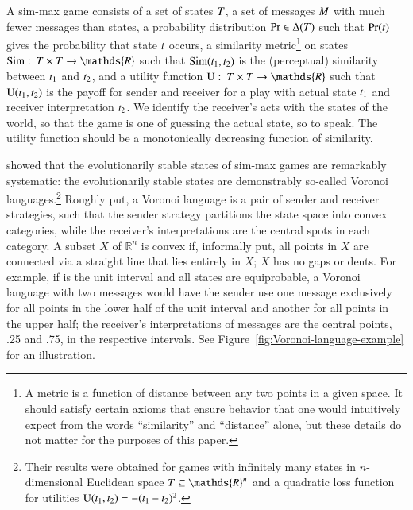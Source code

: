 \documentclass[fleqn,reqno,10pt]{article}
\newcommand{\similarity}{\ensuremath{\mathrm{Sim}}} %
\begin{document}
A sim-max game consists of a set of states $T$, a set of messages $M$ with much
fewer messages than states, a probability distribution $\Pr \in \Delta(T)$ such that
$\Pr(t)$ gives the probability that state $t$ occurs, a similarity metric\footnote{A
  metric is a function of distance between any two points in a given space. It should satisfy
  certain axioms that ensure behavior that one would intuitively expect from the words
  ``similarity'' and ``distance'' alone, but these details do not matter for the purposes of
  this paper.}
on states $\similarity \mycolon \States \times \States \rightarrow \mathds{R}$ such that
$\similarity(\mystate{1}, \mystate{2})$ is the (perceptual) similarity between $t_{\mathrm{1}}$
and $t_{\mathrm{2}}$, and a utility function $\Utils \mycolon \States \times \States \rightarrow
\mathds{R}$ such that $\mathrm{U}(t_{\mathrm{1}}, t_{\mathrm{2}})$ is the payoff for sender and receiver
for a play with actual state $t_{\mathrm{1}}$ and receiver interpretation $t_{\mathrm{2}}$. We
identify the receiver's acts with the states of the world, so that the game is one of guessing
the actual state, so to speak. The utility function should be a monotonically decreasing
function of similarity.

\citet{JagerMetzger2011:Voronoi-Languag} showed that the evolutionarily stable states of
sim-max games are remarkably systematic: the evolutionarily stable states are demonstrably
so-called Voronoi languages.\footnote{Their results were obtained for games with infinitely
  many states in $n$-dimensional Euclidean space $\States \subseteq \mathds{R}^n$ and a
  quadratic loss function for utilities
  $\mathrm{U}(t_{\mathrm{1}}, t_{\mathrm{2}}) = - (t_{\mathrm{1}} - t_{\mathrm{2}})^2$.} Roughly put, a Voronoi
language is a pair of sender and receiver strategies, such that the sender strategy partitions
the state space into convex categories, while the receiver's interpretations are the central
spots in each category. A subset $X$ of $\mathds{R}^n$ is convex if, informally put, all points
in $X$ are connected via a straight line that lies entirely in $X$; $X$ has no gaps or
dents. For example, if \States is the unit interval and all states are equiprobable, a Voronoi
language with two messages would have the sender use one message exclusively for all points in
the lower half of the unit interval and another for all points in the upper half; the
receiver's interpretations of messages are the central points, .25 and .75, in the respective
intervals.  See Figure~\ref{fig:Voronoi-language-example} for an illustration.
\end{document}
